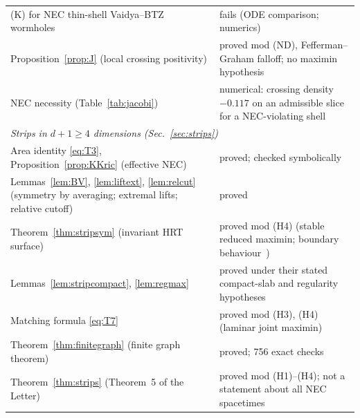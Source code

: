 \documentclass[aps,prd,onecolumn,superscriptaddress,nofootinbib,amsmath,amssymb,11pt]{revtex4-2}
\theoremstyle{definition}
\begin{document}
\begin{table}[h]
\begin{ruledtabular}
\begin{tabular}{p{}p{}}
(K) for NEC thin-shell Vaidya--BTZ wormholes & fails (ODE comparison; numerics)\\
Proposition~\ref{prop:J} (local crossing positivity) & proved mod (ND), Fefferman--Graham falloff; no maximin hypothesis\\
NEC necessity (Table~\ref{tab:jacobi}) & numerical: crossing density $-0.117$ on an admissible slice for a NEC-violating shell\\
\multicolumn{2}{l}{\emph{Strips in $d+1\ge4$ dimensions (Sec.~\ref{sec:strips})}}\\
Area identity \eqref{eq:T3}, Proposition~\ref{prop:KKric} (effective NEC) & proved; checked symbolically\\
Lemmas~\ref{lem:BV}, \ref{lem:liftext}, \ref{lem:relcut} (symmetry by averaging; extremal lifts; relative cutoff) & proved\\
Theorem~\ref{thm:stripsym} (invariant HRT surface) & proved mod (H4) (stable reduced maximin; boundary behaviour~\cite{Sorce2019})\\
Lemmas~\ref{lem:stripcompact}, \ref{lem:regmax} & proved under their stated compact-slab and regularity hypotheses\\
Matching formula \eqref{eq:T7} & proved mod (H3), (H4) (laminar joint maximin)\\
Theorem~\ref{thm:finitegraph} (finite graph theorem) & proved; 756 exact checks\\
Theorem~\ref{thm:strips} (Theorem~5 of the Letter) & proved mod (H1)--(H4); not a statement about all NEC spacetimes\\
\end{tabular}
\end{ruledtabular}
\end{table}
\end{document}

